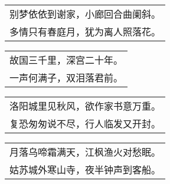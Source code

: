 \nopagebreak%
\nopagebreak%
\noindent\begin{minipage}{\linewidth}
  \vskip-3pt\begin{table}[H]
    \centering
    \begin{tabular}{@{}l@{}}
别梦依依到谢家，小廊回合曲阑斜。\\
多情只有春庭月，犹为离人照落花。
    \end{tabular}
  \end{table}
\end{minipage}
\vspace{1cm}


\nopagebreak%
\nopagebreak%
\noindent\begin{minipage}{\linewidth}
  \vskip-3pt\begin{table}[H]
    \centering
    \begin{tabular}{@{}l@{}}
故国三千里，深宫二十年。\\
一声何满子，双泪落君前。
    \end{tabular}
  \end{table}
\end{minipage}
\vspace{1cm}


\nopagebreak%
\nopagebreak%
\noindent\begin{minipage}{\linewidth}
  \vskip-3pt\begin{table}[H]
    \centering
    \begin{tabular}{@{}l@{}}
洛阳城里见秋风，欲作家书意万重。\\
复恐匆匆说不尽，行人临发又开封。
    \end{tabular}
  \end{table}
\end{minipage}
\vspace{1cm}


\nopagebreak%
\nopagebreak%
\noindent\begin{minipage}{\linewidth}
  \vskip-3pt\begin{table}[H]
    \centering
    \begin{tabular}{@{}l@{}}
月落乌啼霜满天，江枫渔火对愁眠。\\
姑苏城外寒山寺，夜半钟声到客船。
    \end{tabular}
  \end{table}
\end{minipage}
\vspace{1cm}


